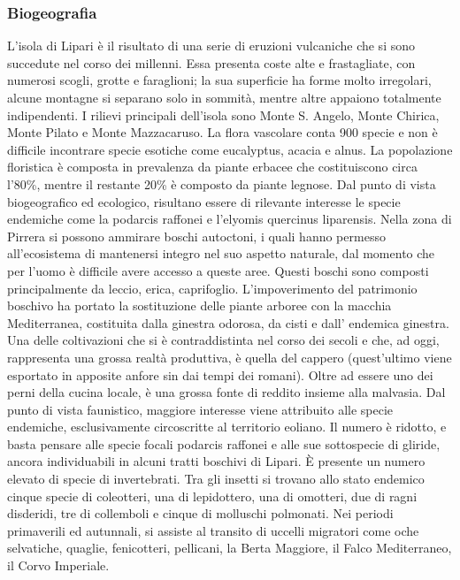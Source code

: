 \documentclass[fleqn,10pt]{SelfArx} %
\begin{document}
\subsubsection{Biogeografia}
L'isola di Lipari è il risultato di una serie di eruzioni vulcaniche che si sono succedute nel corso dei millenni. 
Essa presenta coste alte e frastagliate, con numerosi scogli, grotte e faraglioni; la sua superficie ha forme molto irregolari, alcune montagne si separano solo in sommità, mentre altre appaiono totalmente indipendenti. 
I rilievi principali dell'isola sono Monte S. Angelo, Monte Chirica, Monte Pilato e Monte Mazzacaruso.
La flora vascolare conta 900 specie e non è difficile incontrare specie esotiche come eucalyptus, acacia e alnus. 
La popolazione floristica è composta in prevalenza da piante erbacee che costituiscono circa l'80\%, mentre il restante 20\% è composto da piante legnose. 
Dal punto di vista biogeografico ed ecologico, risultano essere di rilevante interesse le specie endemiche come la podarcis raffonei e l'elyomis quercinus liparensis. 
Nella zona di Pirrera si possono ammirare boschi autoctoni, i quali hanno permesso all'ecosistema di mantenersi integro nel suo aspetto naturale, dal momento che per l'uomo è difficile avere accesso a queste aree. 
Questi boschi sono composti principalmente da leccio, erica, caprifoglio. 
L'impoverimento del patrimonio boschivo ha portato la sostituzione delle piante arboree con la macchia Mediterranea, costituita dalla ginestra odorosa, da cisti e dall' endemica ginestra.
Una delle coltivazioni che si è contraddistinta nel corso dei secoli e che, ad oggi, rappresenta una grossa realtà produttiva, è quella del cappero (quest'ultimo viene esportato in apposite anfore sin dai tempi dei romani). 
Oltre ad essere uno dei perni della cucina locale, è una grossa fonte di reddito insieme alla malvasia.
Dal punto di vista faunistico, maggiore interesse viene attribuito alle specie endemiche, esclusivamente circoscritte al territorio eoliano. 
Il numero è ridotto, e basta pensare alle specie focali podarcis raffonei e alle sue sottospecie di gliride, ancora individuabili in alcuni tratti boschivi di Lipari. È presente un numero elevato di specie di invertebrati. 
Tra gli insetti si trovano allo stato endemico cinque specie di coleotteri, una di lepidottero, una di omotteri, due di ragni disderidi, tre di collemboli e cinque di molluschi polmonati.
Nei periodi primaverili ed autunnali, si assiste al transito di uccelli migratori come oche selvatiche, quaglie, fenicotteri, pellicani, la Berta Maggiore, il Falco Mediterraneo, il Corvo Imperiale.
\end{document}
